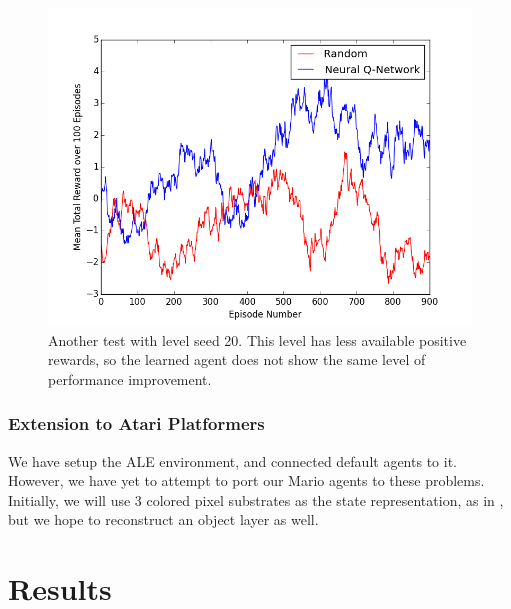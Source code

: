\documentclass{article}
\begin{document}
\begin{figure}
\begin{center}
\includegraphics[scale=0.42]{seed20.png}
\caption{Another test with level seed 20. This level has less available positive rewards, so the learned agent does not show the same level of performance improvement.}
\end{center}
\end{figure}

\subsubsection{Extension to Atari Platformers}
We have setup the ALE environment, and connected default agents to it. However, we have yet to attempt to port our Mario agents to these problems. Initially, we will use 3 colored pixel substrates as the state representation, as in \cite{Hauskneck13}, but we hope to reconstruct an object layer as well.
 
 \section{Results}
 
\end{document}
